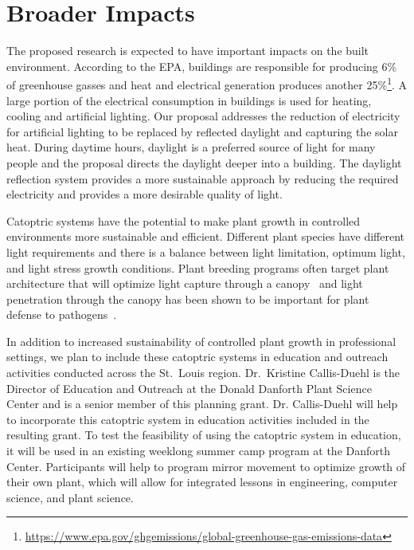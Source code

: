 \section{Broader Impacts}
\label{sec:broader}

The proposed research is expected to have important impacts on the built environment.
According to the EPA, buildings are responsible for producing 6\% of
greenhouse gasses and heat and electrical generation produces another
25\%\footnote{\url{https://www.epa.gov/ghgemissions/global-greenhouse-gas-emissions-data}}.
A large portion of the electrical consumption in buildings is used for
heating, cooling and artificial lighting. Our proposal addresses the
reduction of electricity for artificial lighting to be replaced by
reflected daylight and capturing the solar heat. During daytime hours,
daylight is a preferred source of light for many people and the proposal
directs the daylight deeper into a building. The daylight reflection system
provides a more sustainable approach by reducing the required electricity
and provides a more desirable quality of light.

Catoptric systems have the potential to make plant growth in controlled
environments more sustainable and efficient. Different plant species have
different light requirements and there is a balance between light limitation,
optimum light, and light stress growth conditions. Plant breeding programs
often target plant architecture that will optimize light capture through a
canopy~\cite{burgess17} and light penetration through the canopy has been
shown to be important for plant defense to pathogens~\cite{ballare12}.

In addition to increased sustainability of controlled plant growth in
professional
settings, we plan to include these catoptric systems in education and
outreach activities conducted across the St.~Louis region. Dr.~Kristine
Callis-Duehl is the Director of Education and Outreach at the Donald Danforth
Plant Science Center and is a senior member of this planning grant. Dr.
Callis-Duehl will help to incorporate this catoptric system in education
activities included in the resulting grant. To test the feasibility of using
the catoptric system in education, it will be used in an
existing weeklong summer camp program at the Danforth Center. Participants will
help to program mirror movement to optimize growth of their own plant, which
will allow for integrated lessons in engineering, computer science, and plant
science.  

